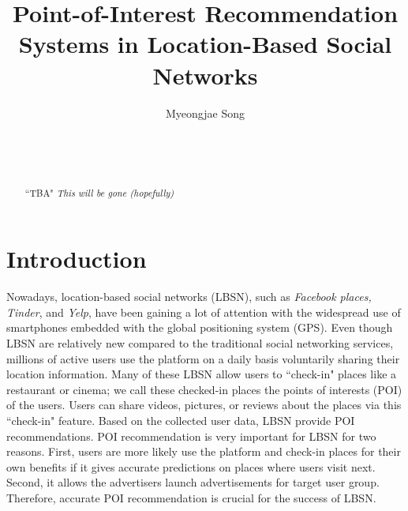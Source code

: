 \documentclass{sig-alternate}
\begin{document}

\title{Point-of-Interest Recommendation Systems in Location-Based Social Networks}


\author{
\alignauthor
Myeongjae Song\\
	\\
	\\
	\\
}

\maketitle
\begin{abstract}
``TBA"
\emph{This will be gone (hopefully)}

\end{abstract}



\section{Introduction}
\label{sec:introduction}

Nowadays, location-based social networks (LBSN), such as \emph{Facebook places, Tinder},  and \emph{Yelp}, 
have been gaining a lot of attention with the widespread use of smartphones embedded with the 
global positioning system (GPS). Even though LBSN are relatively new compared to 
the traditional social networking services, millions of active users use the platform on a daily basis voluntarily sharing 
their location information. Many of these LBSN allow users to ``check-in" 
places like a restaurant or cinema; we call these checked-in places the points of interests (POI) 
of the users. Users can share videos, pictures, or reviews about the places via this ``check-in" 
feature. Based on the collected user data, LBSN provide POI recommendations. POI recommendation 
is very important for LBSN for two reasons. First, users are more likely use the platform and check-in places 
for their own benefits if it gives accurate predictions on places where users visit next. 
Second, it allows the advertisers launch advertisements for target user group. Therefore, 
accurate POI recommendation is crucial for the success of LBSN.
\end{document}

